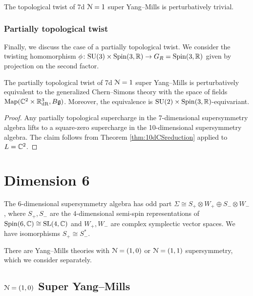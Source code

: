 \documentclass[10pt, oneside]{article}
\begin{document}
\begin{cor}
The topological twist of 7d $\mathcal N=1$ super Yang--Mills is perturbatively trivial.
\end{cor}

\subsubsection{Partially topological twist}

Finally, we discuss the case of a partially topological twist. We consider the twisting homomorphism $\phi\colon \mathrm{SU}(3)\times \mathrm{Spin}(3, \mathbb R)\rightarrow G_R=\mathrm{Spin}(3, \mathbb R)$ given by projection on the second factor.

\begin{thm}
The partially topological twist of 7d $\mathcal N=1$ super Yang--Mills is perturbatively equivalent to the generalized Chern--Simons theory with the space of fields $\operatorname{Map}(\mathbb C^2\times \mathbb R^3_{\mathrm{dR}}, B\mathfrak g)$. Moreover, the equivalence is $\mathrm{SU}(2)\times \mathrm{Spin}(3, \mathbb R)$-equivariant.
\label{thm:7dpartiallytopologicaltwist}
\end{thm}
\begin{proof}
Any partially topological supercharge in the 7-dimensional supersymmetry algebra lifts to a square-zero supercharge in the 10-dimensional supersymmetry algebra. The claim follows from Theorem \ref{thm:10dCSreduction} applied to $L=\mathbb C^2$.
\end{proof}

\section{Dimension 6}

The 6-dimensional supersymmetry algebra has odd part $\Sigma\cong S_+\otimes W_+\oplus S_-\otimes W_-$, where $S_+, S_-$ are the 4-dimensional semi-spin representations of $\mathrm{Spin}(6, \mathbb C)\cong \mathrm{SL}(4, \mathbb C)$ and $W_+, W_-$ are complex symplectic vector spaces. We have isomorphisms $S_+\cong S_-^*$.

There are Yang--Mills theories with $\mathcal N=(1, 0)$ or $\mathcal N=(1, 1)$ supersymmetry, which we consider separately.

\subsection{\texorpdfstring{$\mathcal N=(1, 0)$}{N=(1, 0)} Super Yang--Mills}
\end{document}
